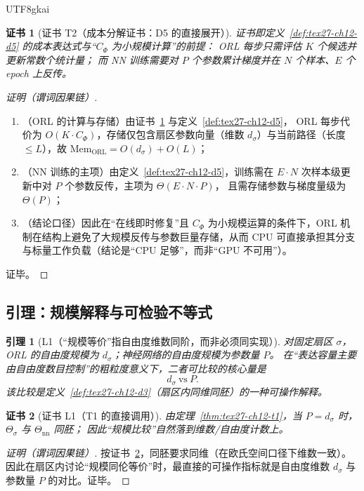 \documentclass[12pt]{article}
\newtheorem{lemma}{引理}[section]
\newtheorem{Certificate}{证书}[section]
\begin{document}
\begin{CJK*}{UTF8}{gkai}
\begin{Certificate}[证书 T2（成本分解证书：D5 的直接展开）]
\label{cert:tex27-ch12-t2}
证书即定义~\ref{def:tex27-ch12-d5} 的成本表达式与“$C_\Phi$ 为小规模计算”的前提：
ORL 每步只需评估 $K$ 个候选并更新常数个统计量；
而 NN 训练需要对 $P$ 个参数累计梯度并在 $N$ 个样本、$E$ 个 epoch 上反传。
\end{Certificate}

\begin{proof}[证明（谓词因果链）]
\begin{enumerate}
  \item（ORL 的计算与存储）由证书~\ref{cert:tex27-ch12-t2} 与定义~\ref{def:tex27-ch12-d5}，
  ORL 每步代价为 $O(K\cdot C_\Phi)$，存储仅包含扇区参数向量（维数 $d_\sigma$）与当前路径（长度 $\le L$），故 $\mathrm{Mem}_{\mathrm{ORL}}=O(d_\sigma)
    +O(L)$；
  \item（NN 训练的主项）由定义~\ref{def:tex27-ch12-d5}，训练需在 $E\cdot N$ 次样本级更新中对 $P$ 个参数反传，主项为 $\Theta(E\cdot N\cdot P)$，
    且需存储参数与梯度量级为 $\Theta(P)$；
  \item（结论口径）因此在“在线即时修复”且 $C_\Phi$ 为小规模运算的条件下，ORL 机制在结构上避免了大规模反传与参数巨量存储，从而 CPU 可直接承担其分支与标量工作负载（结论是“CPU 足够”，而非“GPU 不可用”）。
\end{enumerate}
证毕。
\end{proof}

\subsection{引理：规模解释与可检验不等式}
\label{subsec:tex27-ch12-lemmas}

\begin{lemma}[L1（“规模等价”指自由度维数同阶，而非必须同实现）]
\label{lem:tex27-ch12-l1}
对固定扇区 $\sigma$，ORL 的自由度规模为 $d_\sigma$；神经网络的自由度规模为参数量 $P$。
在“表达容量主要由自由度数目控制”的粗粒度意义下，二者可比较的核心量是
\[
  d_\sigma\ \text{vs}\ P.
\]
该比较是定义~\ref{def:tex27-ch12-d3}（扇区内同维同胚）的一种可操作解释。
\end{lemma}

\begin{Certificate}[证书 L1（T1 的直接调用）]
\label{cert:tex27-ch12-l1}
由定理~\ref{thm:tex27-ch12-t1}，当 $P=d_\sigma$ 时，$\Theta_\sigma$ 与 $\Theta_{\mathrm{nn}}$ 同胚；
因此“规模比较”自然落到维数/自由度计数上。
\end{Certificate}

\begin{proof}[证明（谓词因果链）]
按证书~\ref{cert:tex27-ch12-l1}，同胚要求同维（在欧氏空间口径下维数一致）。
因此在扇区内讨论“规模同伦等价”时，最直接的可操作指标就是自由度维数 $d_\sigma$ 与参数量 $P$ 的对比。证毕。
\end{proof}


\end{CJK*}
\end{document}
